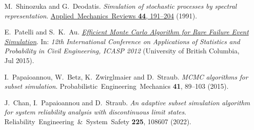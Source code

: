 {\hangindent=0.33in {}\hypertarget{17514431937910934166}{}M.~Shinozuka and G.~Deodatis. \emph{Simulation of stochastic processes by spectral representation}. \href{https://doi.org/10.1115/1.3119501}{Applied~Mechanics~Reviews \textbf{44}, 191–204} (1991).

\hangindent=0.33in {}\hypertarget{17411345754570781475}{}E.~Patelli and S.~K.~Au. \href{https://www.researchgate.net/publication/280224186\_Efficient\_Monte\_Carlo\_Algorithm\_For\_Rare\_Failure\_Event\_Simulation}{\emph{Efficient Monte Carlo Algorithm for Rare Failure Event Simulation}}. In: \emph{12th International Conference on Applications of Statistics and Probability in Civil Engineering, ICASP 2012} (University of British Columbia, Jul 2015).

\hangindent=0.33in {}\hypertarget{8907925646719725278}{}I.~Papaioannou, W.~Betz, K.~Zwirglmaier and D.~Straub. \emph{MCMC algorithms for subset simulation}. Probabilistic~Engineering~Mechanics \textbf{41}, 89–103 (2015).

\hangindent=0.33in {}\hypertarget{2393110712994691496}{}J.~Chan, I.~Papaioannou and D.~Straub. \emph{An adaptive subset simulation algorithm for system reliability analysis with discontinuous limit states}. Reliability~Engineering~\&~System~Safety \textbf{225}, 108607 (2022).

}%



